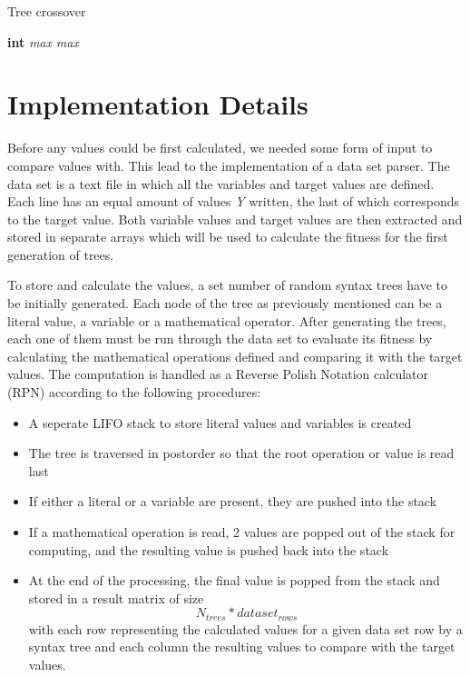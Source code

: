 \documentclass[runningheads]{llncs}
\begin{document}
\begin{algorithm}
\caption{Tree crossover}
\begin{algorithmic}[1]
\State \textbf{int} \textit{max}
	\EndFor
\Else {}
	\EndFor
\Else
	\EndFor
\EndIf
\EndIf
\State \Return \textit{max}
\EndProcedure
\end{algorithmic}
\label{crossover_alg}
\end{algorithm}


\section{Implementation Details}
Before any values could be first calculated, we needed some form of input to compare values with. This lead to the implementation of a data set parser. The data set is a text file in which all the variables and target values are defined. Each line has an equal amount of values \textit{Y} written, the last of which corresponds to the target value. Both variable values and target values are then extracted and stored in separate arrays which will be used to calculate the fitness for the first generation of trees.

To store and calculate the values, a set number of random syntax trees have to be initially generated. Each node of the tree as previously mentioned can be a literal value, a variable or a mathematical operator. After generating the trees, each one of them must be run through the data set to evaluate its fitness by calculating the mathematical operations defined and comparing it with the target values. The computation is handled as a Reverse Polish Notation calculator (RPN) according to the following procedures:
\begin{itemize}
	\item A seperate LIFO stack to store literal values and variables is created
	\item The tree is traversed in postorder so that the root operation or value is read last
	\item If either a literal or a variable are present, they are pushed into the stack
	\item If a mathematical operation is read, 2 values are popped out of the stack for computing, and the resulting value is pushed back into the stack
	\item At the end of the processing, the final value is popped from the stack and stored in a result matrix of size $$N_{trees}*dataset_{rows}$$ with each row representing the calculated values for a given data set row by a syntax tree and each column the resulting values to compare with the target values.
\end{itemize}
\end{document}
